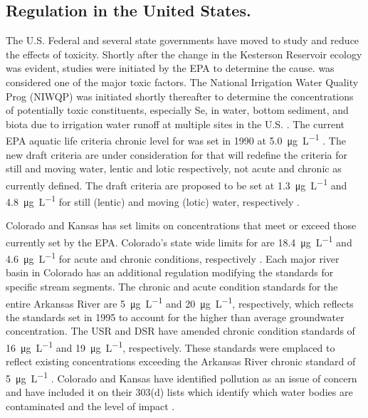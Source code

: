 \subsection*{\Se Regulation in the United States.}
The U.S. Federal and several state governments have moved to study and reduce the effects of \Se toxicity.  Shortly after the change in the Kesterson Reservoir ecology was evident, studies were initiated by the EPA to determine the cause.  \Se was considered one of the major toxic factors.  The National Irrigation Water Quality Prog (NIWQP) was initiated shortly thereafter to determine the concentrations of potentially toxic constituents, especially Se, in water, bottom sediment, and biota due to irrigation water runoff at multiple sites in the U.S. \parencite{Hamilton1999}.  The current EPA aquatic life criteria chronic level for \Se was set in 1990 at \SI{5.0}{\micro\g\per\liter} \parencite{EPA-Se}.  The new draft criteria are under consideration for \Se that will redefine the criteria for still and moving water, lentic and lotic respectively, not acute and chronic as currently defined.  The draft criteria are proposed to be set at \SI{1.3}{\micro\g\per\liter} and \SI{4.8}{\micro\g\per\liter} for still (lentic) and moving (lotic) water, respectively \parencite{2014USEPA,Hamilton1999,EPA-Se}.

Colorado and Kansas has set limits on \Se concentrations that meet or exceed those currently set by the EPA.  Colorado's state wide limits for \Se are \SI{18.4}{\micro\g\per\liter} and \SI{4.6}{\micro\g\per\liter} for acute and chronic conditions, respectively \parencite{5CCR1002-31}.  Each major river basin in Colorado has an additional regulation modifying the standards for specific stream segments.  The chronic and acute condition standards for the entire Arkansas River are \SI{5}{\micro\g\per\liter} and \SI{20}{\micro\g\per\liter}, respectively, which reflects the standards set in 1995 to account for the higher than average groundwater \Se concentration.  The USR and DSR have amended chronic condition standards of \SI{16}{\micro\g\per\liter} and \SI{19}{\micro\g\per\liter}, respectively.  These standards were emplaced to reflect existing \Se concentrations exceeding the Arkansas River chronic standard of \SI{5}{\micro\g\per\liter} \parencite{5CCR1002-32}.  Colorado and Kansas have identified \Se pollution as an issue of concern and have included it on their 303(d) lists which identify which water bodies are contaminated and the level of impact \parencite{5CCR1002-93,2014Kansas303d}.

